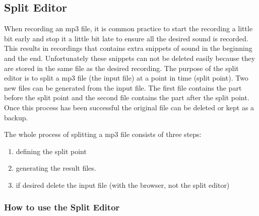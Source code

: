 \subsection{Split Editor}
When recording an mp3 file, it is common practice to start the recording
a little bit early and stop it a little bit late to ensure all the
desired sound is recorded. This results in recordings that contains
extra snippets of sound in the beginning and the end. Unfortunately these
snippets can not be deleted easily because they are stored in the same
file as the desired recording. The purpose of the split editor is to
split a mp3 file (the input file) at a point in time (split point). Two
new files can be generated from the input file. The first file contains
the part before the split point and the second file contains the part
after the split point. Once this process has been successful the
original file can be deleted or kept as a backup. 

The whole process of splitting a mp3 file consists of three steps: 

\begin{enumerate}
\item defining the split point 
\item generating the result files. 
\item if desired delete the input file (with the browser, not the split
editor) 
\end{enumerate}

\subsubsection{How to use the Split Editor}

